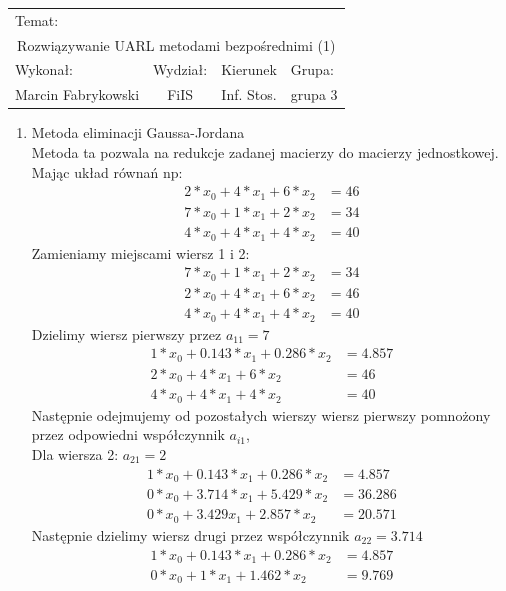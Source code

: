 \documentclass[12pt,a4paper]{article}
\begin{document}
 
\large
\begin{tabular}{|c|c|c|c|}
\hline
\multicolumn{4}{|l|}{Temat:}\\
\multicolumn{4}{|c|}{Rozwiązywanie UARL metodami bezpośrednimi (1)}\\
\hline
\multicolumn{1}{|l}{Wykonał:}&\multicolumn{1}{|l}{Wydział:}&\multicolumn{1}{|c}{Kierunek}&\multicolumn{1}{|l|}{Grupa:}\\
Marcin Fabrykowski&FiIS&Inf. Stos.&grupa 3\\
\hline
\end{tabular}
\normalsize
\vspace{2cm}
\begin{enumerate}
\item Metoda eliminacji Gaussa-Jordana\\
Metoda ta pozwala na redukcje zadanej macierzy do macierzy jednostkowej.\\
Mając układ równań np:
\begin{align}
2*x_0+4*x_1+6*x_2&=46\\
\nonumber 7*x_0+1*x_1+2*x_2&=34\\
\nonumber 4*x_0+4*x_1+4*x_2&=40
\end{align}
Zamieniamy miejscami wiersz 1 i 2:
\begin{align}
7*x_0+1*x_1+2*x_2&=34\\
\nonumber 2*x_0+4*x_1+6*x_2&=46\\
\nonumber 4*x_0+4*x_1+4*x_2&=40
\end{align}
Dzielimy wiersz pierwszy przez $a_{11}=7$
\begin{align}
1*x_0+0.143*x_1+0.286*x_2&=4.857\\
\nonumber 2*x_0+4*x_1+6*x_2&=46\\
\nonumber 4*x_0+4*x_1+4*x_2&=40
\end{align}
Następnie odejmujemy od pozostałych wierszy wiersz pierwszy pomnożony przez odpowiedni współczynnik $a_{i1}$,\\Dla wiersza 2: $a_{21}=2$
\begin{align}
1*x_0+0.143*x_1+0.286*x_2&=4.857\\
\nonumber 0*x_0+3.714*x_1+5.429*x_2&=36.286\\
\nonumber 0*x_0+3.429x_1+2.857*x_2&=20.571
\end{align}
Następnie dzielimy wiersz drugi przez współczynnik $a_{22}=3.714$
\begin{align}
1*x_0+0.143*x_1+0.286*x_2&=4.857\\
\nonumber 0*x_0+1*x_1+1.462*x_2&=9.769\\

\end{align}
\end{enumerate}
\end{document}
